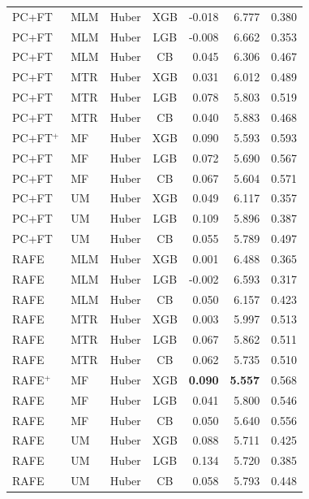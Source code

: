 \documentclass[9pt,a4paper]{article}
\begin{document}
\begin{scriptsize}
\begin{longtable}{lllcrrr}
\midrule
PC+FT & MLM & Huber & XGB & -0.018 & 6.777 & 0.380 \\
PC+FT & MLM & Huber & LGB & -0.008 & 6.662 & 0.353 \\
PC+FT & MLM & Huber & CB  & 0.045 & 6.306 & 0.467 \\
PC+FT & MTR & Huber & XGB & 0.031 & 6.012 & 0.489 \\
PC+FT & MTR & Huber & LGB & 0.078 & 5.803 & 0.519 \\
PC+FT & MTR & Huber & CB  & 0.040 & 5.883 & 0.468 \\
PC+FT$^+$ & MF & Huber & XGB & 0.090 & 5.593 & 0.593 \\
PC+FT & MF  & Huber & LGB & 0.072 & 5.690 & 0.567 \\
PC+FT & MF  & Huber & CB  & 0.067 & 5.604 & 0.571 \\
PC+FT & UM  & Huber & XGB & 0.049 & 6.117 & 0.357 \\
PC+FT & UM  & Huber & LGB & 0.109 & 5.896 & 0.387 \\
PC+FT & UM  & Huber & CB  & 0.055 & 5.789 & 0.497 \\
\midrule
RAFE & MLM & Huber & XGB & 0.001 & 6.488 & 0.365 \\
RAFE & MLM & Huber & LGB & -0.002 & 6.593 & 0.317 \\
RAFE & MLM & Huber & CB  & 0.050 & 6.157 & 0.423 \\
RAFE & MTR & Huber & XGB & 0.003 & 5.997 & 0.513 \\
RAFE & MTR & Huber & LGB & 0.067 & 5.862 & 0.511 \\
RAFE & MTR & Huber & CB  & 0.062 & 5.735 & 0.510 \\
RAFE$^+$ & MF  & Huber & XGB & \textbf{0.090} & \textbf{5.557} & 0.568 \\
RAFE & MF  & Huber & LGB & 0.041 & 5.800 & 0.546 \\
RAFE & MF  & Huber & CB  & 0.050 & 5.640 & 0.556 \\
RAFE & UM  & Huber & XGB & 0.088 & 5.711 & 0.425 \\
RAFE & UM  & Huber & LGB & 0.134 & 5.720 & 0.385 \\
RAFE & UM  & Huber & CB  & 0.058 & 5.793 & 0.448 \\
\end{longtable}
\end{scriptsize}

\newpage

\end{document}
